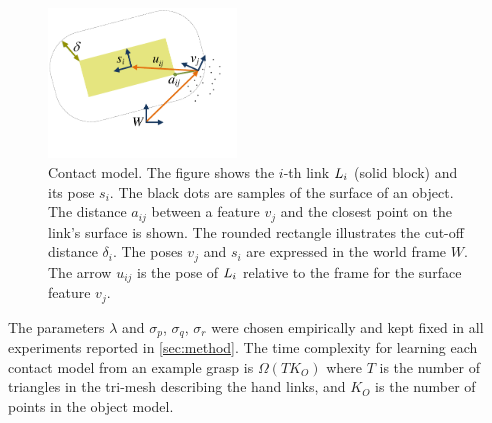 \begin{figure}[t]
\centerline{\includegraphics[width=5cm]{resources/model}}
\caption[Contact model]{Contact model. The figure shows the $i$-th link $L_i$ (solid block) and its pose $s_i$. The black dots are samples of the surface of an object. The distance $a_{ij}$ between a feature $v_j$ and the closest point on the link's surface is shown. The rounded rectangle illustrates the cut-off distance $\delta_i$. The poses $v_j$ and $s_i$ are expressed in the world frame $W$. The arrow $u_{ij}$ is the pose of $L_i$ relative to the frame for the surface feature $v_j$.}
\label{fig:representations.model}
\end{figure}

The parameters $\lambda$ and $\sigma_{p}$, $\sigma_{q}$, $\sigma_{r}$ were chosen empirically and kept fixed in all experiments reported in \sect\ref{sec:method}. The time complexity for learning each contact model from an example grasp is $\Omega(T K_O)$ where $T$ is the number of triangles in the tri-mesh describing the hand links, and $K_O$ is the number of points in the object model.




